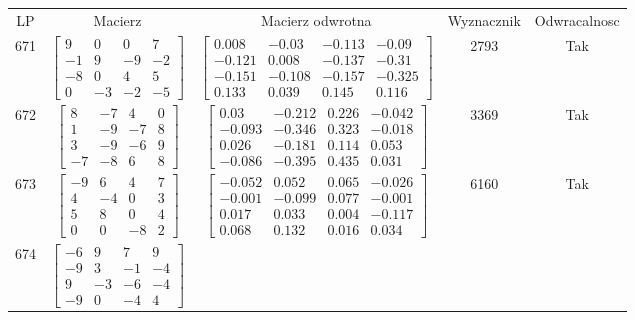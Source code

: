 \documentclass[a4paper,12pt]{article}
\begin{document}
\bgroup {} \vspace{0.2in} \begin{tabular}{c c c c c}
LP & Macierz & Macierz odwrotna & Wyznacznik & Odwracalnosc\\
671
&
$\begin{bmatrix} 9 & 0 & 0 & 7 \\ -1 & 9 & -9 & -2 \\ -8 & 0 & 4 & 5 \\ 0 & -3 & -2 & -5 \end{bmatrix}$
&
$\begin{bmatrix} 0.008 & -0.03 & -0.113 & -0.09 \\ -0.121 & 0.008 & -0.137 & -0.31 \\ -0.151 & -0.108 & -0.157 & -0.325 \\ 0.133 & 0.039 & 0.145 & 0.116 \end{bmatrix}$
&
2793
&
Tak
\\
672
&
$\begin{bmatrix} 8 & -7 & 4 & 0 \\ 1 & -9 & -7 & 8 \\ 3 & -9 & -6 & 9 \\ -7 & -8 & 6 & 8 \end{bmatrix}$
&
$\begin{bmatrix} 0.03 & -0.212 & 0.226 & -0.042 \\ -0.093 & -0.346 & 0.323 & -0.018 \\ 0.026 & -0.181 & 0.114 & 0.053 \\ -0.086 & -0.395 & 0.435 & 0.031 \end{bmatrix}$
&
3369
&
Tak
\\
673
&
$\begin{bmatrix} -9 & 6 & 4 & 7 \\ 4 & -4 & 0 & 3 \\ 5 & 8 & 0 & 4 \\ 0 & 0 & -8 & 2 \end{bmatrix}$
&
$\begin{bmatrix} -0.052 & 0.052 & 0.065 & -0.026 \\ -0.001 & -0.099 & 0.077 & -0.001 \\ 0.017 & 0.033 & 0.004 & -0.117 \\ 0.068 & 0.132 & 0.016 & 0.034 \end{bmatrix}$
&
6160
&
Tak
\\
674
&
$\begin{bmatrix} -6 & 9 & 7 & 9 \\ -9 & 3 & -1 & -4 \\ 9 & -3 & -6 & -4 \\ -9 & 0 & -4 & 4 \end{bmatrix}$

\end{tabular}
\end{document}

